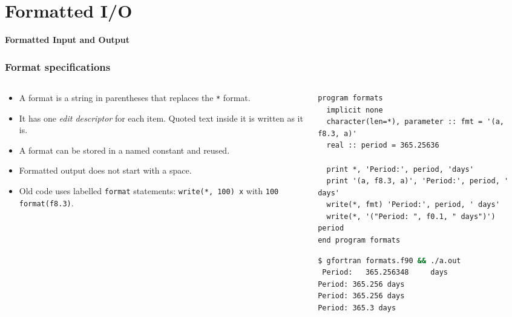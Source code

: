 \section{Formatted I/O}

\begin{frame}
  \centering
  \Huge \textbf{Formatted Input and Output}
\end{frame}


\begin{frame}[fragile]
  \frametitle{Format specifications}
  \begin{columns}[T]
    \begin{column}{0.45\textwidth}
      \begin{itemize}
        \item A format is a string in parentheses that replaces the \texttt{*} format.
        \item It has one \emph{edit descriptor} for each item. Quoted text inside it is written as it is.
        \item A format can be stored in a named constant and reused.
        \item Formatted output does not start with a space.
        \item Old code uses labelled \texttt{format} statements: \texttt{write(*, 100) x} with \texttt{100 format(f8.3)}.
      \end{itemize}
    \end{column}

    \begin{column}{0.55\textwidth}
      \begin{lstlisting}
program formats
  implicit none
  character(len=*), parameter :: fmt = '(a, f8.3, a)'
  real :: period = 365.25636

  print *, 'Period:', period, 'days'
  print '(a, f8.3, a)', 'Period:', period, ' days'
  write(*, fmt) 'Period:', period, ' days'
  write(*, '("Period: ", f0.1, " days")') period
end program formats
      \end{lstlisting}
      \begin{lstlisting}[language=bash]
$ gfortran formats.f90 && ./a.out
 Period:   365.256348     days
Period: 365.256 days
Period: 365.256 days
Period: 365.3 days
      \end{lstlisting}
    \end{column}
  \end{columns}
\end{frame}


